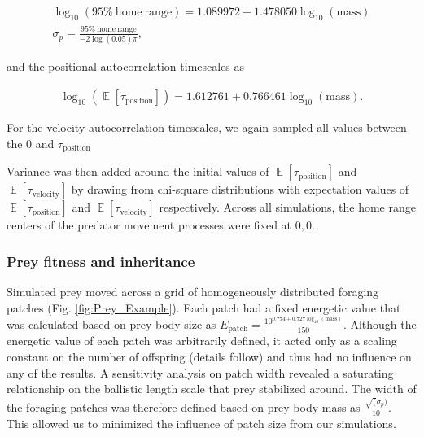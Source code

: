 \documentclass[12pt]{article}
\DeclareMathOperator{\E}{\mathbb{E}}
\begin{document}
\begin{gather}\label{eq:predator-allo}
\log_{10}(\mathrm{95\%~home~range}) = 1.089972 + 1.478050 \log_{10}(\mathrm{mass}) \\
\sigma_p = \frac{\mathrm{95\%~home~range}}{-2 \log(0.05)  \pi},
\end{gather}

and the positional autocorrelation timescales as

\begin{gather}\label{eq:predator-allo-taup}
\log_{10}(\E[\tau_\mathrm{position}]) = 1.612761 + 0.766461 \log_{10}(\mathrm{mass}).
\end{gather}

For the velocity autocorrelation timescales, we again sampled all values between the 0 and $\tau_\mathrm{position}$


Variance was then added around the initial values of $\E[\tau_\mathrm{position}]$ and $\E[\tau_\mathrm{velocity}]$ by drawing from chi-square distributions with expectation values of $\E[\tau_\mathrm{position}]$ and $\E[\tau_\mathrm{velocity}]$ respectively. Across all simulations, the home range centers of the predator movement processes were fixed at $0,0$.

\subsubsection*{Prey fitness and inheritance}

Simulated prey moved across a grid of homogeneously distributed foraging patches (Fig. \ref{fig:Prey_Example}). Each patch had a fixed energetic value that was calculated based on prey body size as $E_{\mathrm{patch}} = \frac{10^{0.774 + 0.727\log_{10}(\mathrm{mass})}}{150}$. Although the energetic value of each patch was arbitrarily defined, it acted only as a scaling constant on the number of offspring (details follow) and thus had no influence on any of the results. A sensitivity analysis on patch width revealed a saturating relationship on the ballistic length scale that prey stabilized around. The width of the foraging patches was therefore defined based on prey body mass as $\frac{\sqrt(\sigma_p)}{10}$. This allowed us to minimized the influence of patch size from our simulations. 
\end{document}

